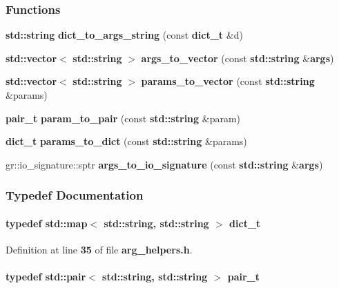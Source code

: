 \subsubsection*{Functions}
\begin{DoxyCompactItemize}
\item 
{\bf std\+::string} {\bf dict\+\_\+to\+\_\+args\+\_\+string} (const {\bf dict\+\_\+t} \&d)
\item 
{\bf std\+::vector}$<$ {\bf std\+::string} $>$ {\bf args\+\_\+to\+\_\+vector} (const {\bf std\+::string} \&{\bf args})
\item 
{\bf std\+::vector}$<$ {\bf std\+::string} $>$ {\bf params\+\_\+to\+\_\+vector} (const {\bf std\+::string} \&params)
\item 
{\bf pair\+\_\+t} {\bf param\+\_\+to\+\_\+pair} (const {\bf std\+::string} \&param)
\item 
{\bf dict\+\_\+t} {\bf params\+\_\+to\+\_\+dict} (const {\bf std\+::string} \&params)
\item 
gr\+::io\+\_\+signature\+::sptr {\bf args\+\_\+to\+\_\+io\+\_\+signature} (const {\bf std\+::string} \&{\bf args})
\end{DoxyCompactItemize}


\subsubsection{Typedef Documentation}
\paragraph[{dict\+\_\+t}]{\setlength{\rightskip}{0pt plus 5cm}typedef std\+::map$<$ {\bf std\+::string}, {\bf std\+::string} $>$ {\bf dict\+\_\+t}}\label{arg__helpers_8h_a4a394422d1a6e956a5cbf8c02c9c99f9}


Definition at line {\bf 35} of file {\bf arg\+\_\+helpers.\+h}.

\paragraph[{pair\+\_\+t}]{\setlength{\rightskip}{0pt plus 5cm}typedef std\+::pair$<$ {\bf std\+::string}, {\bf std\+::string} $>$ {\bf pair\+\_\+t}}\label{arg__helpers_8h_a8d2f40b0916fb339625e848d6d50337c}



